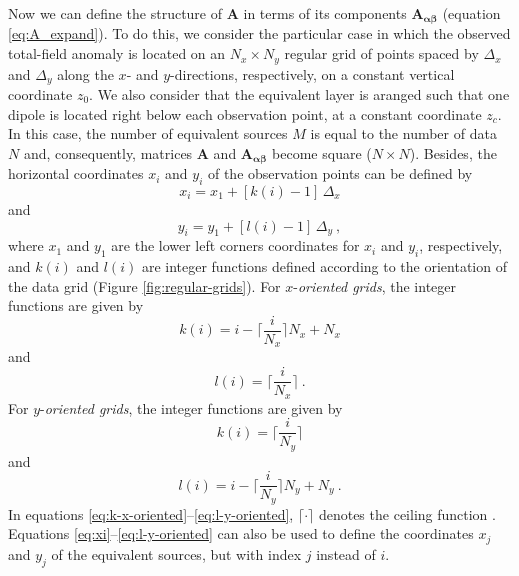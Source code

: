 \documentclass[manuscript]{geophysics}
\begin{document}
Now we can define the structure of $\mathbf{A}$ in terms of its components 
$\mathbf{A_{\boldsymbol{\alpha\beta}}}$ (equation \ref{eq:A_expand}). To do this, 
we consider the particular case in which the observed total-field anomaly is located 
on an $N_{x} \times N_{y}$ 
regular grid of points spaced by $\Delta_{x}$ and $\Delta_{y}$ along the $x$- and $y$-directions,
respectively, on a constant vertical coordinate $z_{0}$. We also consider that the equivalent layer
is aranged such that one dipole is located right below each observation point, at a constant coordinate $z_{c}$.
In this case, the number of equivalent sources $M$ is equal to the number of data $N$ and, 
consequently, matrices $\mathbf{A}$ and $\mathbf{A_{\boldsymbol{\alpha\beta}}}$ become 
square ($N \times N$). 
Besides, the horizontal coordinates $x_{i}$ and $y_{i}$ of the observation points 
can be defined by
\begin{equation}
	x_{i} = x_{1} + \left[ k(i) - 1 \right] \, \Delta_{x}
	\label{eq:xi}
\end{equation}
and
\begin{equation}
	y_{i} = y_{1} + \left[ l(i) - 1 \right] \, \Delta_{y} \: ,
	\label{eq:yi}
\end{equation}
where $x_{1}$ and $y_{1}$ are the lower left corners coordinates for $x_{i}$ and $y_{i}$, respectively,
and $k(i)$ and $l(i)$ are integer functions defined according to the orientation
of the data grid (Figure \ref{fig:regular-grids}). 
For $x$-\textit{oriented grids}, the integer functions are given by
\begin{equation}
	k(i)  = i - \Bigg\lceil \frac{i}{N_{x}} \Bigg\rceil N_{x} + N_{x}
	\label{eq:k-x-oriented}
\end{equation}
and
\begin{equation}
	l(i) = \Bigg\lceil \frac{i}{N_{x}} \Bigg\rceil \: .
	\label{eq:l-x-oriented}
\end{equation}
For $y$-\textit{oriented grids}, the integer functions are given by
\begin{equation}
	k(i) = \Bigg\lceil \frac{i}{N_{y}} \Bigg\rceil
	\label{eq:k-y-oriented}
\end{equation}
and
\begin{equation}
	l(i) = i - \Bigg\lceil \frac{i}{N_{y}} \Bigg\rceil N_{y} + N_{y} \: .
	\label{eq:l-y-oriented}
\end{equation}
In equations \ref{eq:k-x-oriented}--\ref{eq:l-y-oriented}, $\lceil \cdot \rceil$ denotes the ceiling 
function \citep[e.g.,][ p. 67-68]{graham-etal1994}.
Equations \ref{eq:xi}--\ref{eq:l-y-oriented} can also be used to define the coordinates 
$x_{j}$ and $y_{j}$ of the equivalent sources, but with index $j$ instead of $i$.
\end{document}
